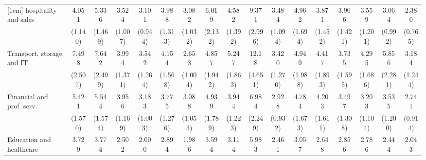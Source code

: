 {\begin{tabular}{l*{16}{c}}
[1em]
hospitality and sales&       4.051\sym{***}&       5.336\sym{***}&       3.524\sym{***}&       3.101\sym{***}&       3.988\sym{***}&       3.082\sym{***}&       6.019\sym{***}&       4.582\sym{***}&       9.371\sym{***}&       3.484\sym{***}&       4.962\sym{***}&       3.871\sym{***}&       3.906\sym{***}&       3.559\sym{***}&       3.064\sym{***}&       2.380\sym{**} \\
                    &     (1.140)         &     (1.469)         &     (1.007)         &     (0.944)         &     (1.313)         &     (1.032)         &     (2.132)         &     (1.392)         &     (2.996)         &     (1.094)         &     (1.694)         &     (1.452)         &     (1.421)         &     (1.201)         &     (0.992)         &     (0.765)         \\
[1em]
Transport, storage and IT.&       7.498\sym{***}&       7.642\sym{***}&       3.994\sym{***}&       3.542\sym{***}&       4.154\sym{***}&       2.653\sym{**} &       4.857\sym{***}&       5.247\sym{***}&       12.18\sym{***}&       3.420\sym{***}&       4.949\sym{***}&       4.417\sym{***}&       3.735\sym{**} &       4.295\sym{***}&       5.856\sym{***}&       3.184\sym{**} \\
                    &     (2.507)         &     (2.499)         &     (1.371)         &     (1.264)         &     (1.568)         &     (1.004)         &     (1.942)         &     (1.863)         &     (4.651)         &     (1.270)         &     (1.988)         &     (1.893)         &     (1.595)         &     (1.686)         &     (2.281)         &     (1.244)         \\
[1em]
Financial and prof. serv.&       5.421\sym{***}&       5.544\sym{***}&       3.956\sym{***}&       3.183\sym{***}&       3.775\sym{***}&       3.088\sym{***}&       4.939\sym{***}&       3.944\sym{***}&       6.984\sym{***}&       2.928\sym{***}&       4.784\sym{***}&       4.203\sym{***}&       3.497\sym{***}&       3.203\sym{***}&       3.535\sym{***}&       2.741\sym{**} \\
                    &     (1.570)         &     (1.574)         &     (1.169)         &     (1.003)         &     (1.276)         &     (1.053)         &     (1.789)         &     (1.223)         &     (2.249)         &     (0.932)         &     (1.673)         &     (1.611)         &     (1.308)         &     (1.104)         &     (1.200)         &     (0.914)         \\
[1em]
Education and healthcare&       3.729\sym{***}&       3.774\sym{***}&       2.502\sym{**} &       2.000\sym{*}  &       2.894\sym{**} &       1.986\sym{*}  &       3.594\sym{***}&       3.114\sym{***}&       5.983\sym{***}&       2.461\sym{**} &       3.057\sym{**} &       2.648\sym{*}  &       2.856\sym{**} &       2.786\sym{**} &       2.444\sym{**} &       2.043\sym{*}  \\

\end{tabular}}
